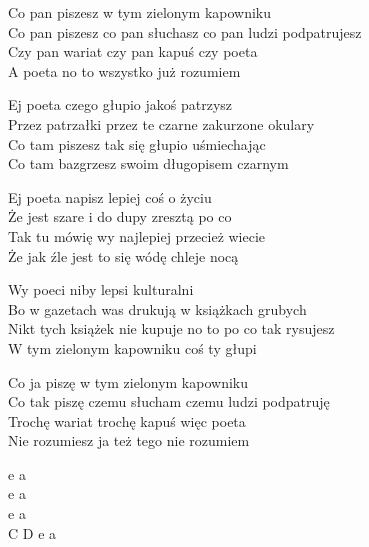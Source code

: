 \begin{text}
    \small{
    Co pan piszesz w tym zielonym kapowniku\\
    Co pan piszesz co pan słuchasz co pan ludzi podpatrujesz\\
    Czy pan wariat czy pan kapuś czy poeta\\
    A poeta no to wszystko już rozumiem

    Ej poeta czego głupio jakoś patrzysz\\
    Przez patrzałki przez te czarne zakurzone okulary\\
    Co tam piszesz tak się głupio uśmiechając\\
    Co tam bazgrzesz swoim długopisem czarnym

    Ej poeta napisz lepiej coś o życiu\\
    Że jest szare i do dupy zresztą po co\\
    Tak tu mówię wy najlepiej przecież wiecie\\
    Że jak źle jest to się wódę chleje nocą

    Wy poeci niby lepsi kulturalni\\
    Bo w gazetach was drukują w książkach grubych\\
    Nikt tych książek nie kupuje no to po co tak rysujesz\\
    W tym zielonym kapowniku coś ty głupi

    Co ja piszę w tym zielonym kapowniku\\
    Co tak piszę czemu słucham czemu ludzi podpatruję\\
    Trochę wariat trochę kapuś więc poeta\\
    Nie rozumiesz ja też tego nie rozumiem
    }
\end{text}
\begin{chord}
    \small{
    e a\\
    e a\\
    e a\\
    C D e a
    }
\end{chord}